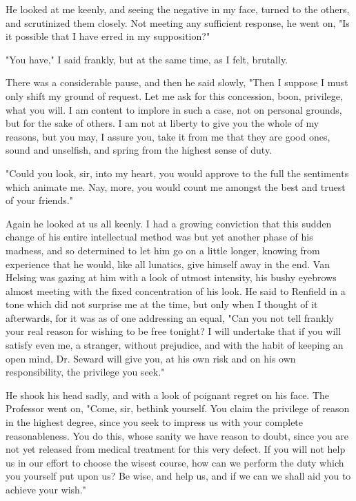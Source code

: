 He looked at me keenly, and seeing the negative in my face, turned to the others, and scrutinized them closely. Not meeting any sufficient response, he went on, "Is it possible that I have erred in my supposition?" 

"You have," I said frankly, but at the same time, as I felt, brutally. 

There was a considerable pause, and then he said slowly, "Then I suppose I must only shift my ground of request. Let me ask for this concession, boon, privilege, what you will. I am content to implore in such a case, not on personal grounds, but for the sake of others. I am not at liberty to give you the whole of my reasons, but you may, I assure you, take it from me that they are good ones, sound and unselfish, and spring from the highest sense of duty. 

"Could you look, sir, into my heart, you would approve to the full the sentiments which animate me. Nay, more, you would count me amongst the best and truest of your friends." 

Again he looked at us all keenly. I had a growing conviction that this sudden change of his entire intellectual method was but yet another phase of his madness, and so determined to let him go on a little longer, knowing from experience that he would, like all lunatics, give himself away in the end. Van Helsing was gazing at him with a look of utmost intensity, his bushy eyebrows almost meeting with the fixed concentration of his look. He said to Renfield in a tone which did not surprise me at the time, but only when I thought of it afterwards, for it was as of one addressing an equal, "Can you not tell frankly your real reason for wishing to be free tonight? I will undertake that if you will satisfy even me, a stranger, without prejudice, and with the habit of keeping an open mind, Dr. Seward will give you, at his own risk and on his own responsibility, the privilege you seek." 

He shook his head sadly, and with a look of poignant regret on his face. The Professor went on, "Come, sir, bethink yourself. You claim the privilege of reason in the highest degree, since you seek to impress us with your complete reasonableness. You do this, whose sanity we have reason to doubt, since you are not yet released from medical treatment for this very defect. If you will not help us in our effort to choose the wisest course, how can we perform the duty which you yourself put upon us? Be wise, and help us, and if we can we shall aid you to achieve your wish." 

